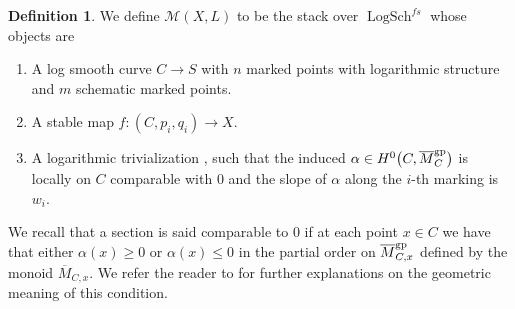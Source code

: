 \documentclass[pdftex]{sigma}
\newcommand{\M}{\mathcal{M}}
\renewcommand{\leq}{\leqslant}
\renewcommand{\geq}{\geqslant}
\numberwithin{equation}{section}
\theoremstyle{definition}
\newtheorem{defi}[theo]{Definition}
\begin{document}
\begin{defi}\label{def:logstablemaps}
 We define $\M(X,L)$ to be the stack over $\operatorname{LogSch}^{fs}$ whose objects are
 \begin{enumerate}\itemsep=0pt
 \item [(1)] A log smooth curve $C\to S$ with $n$ marked points with logarithmic structure and $m$ schematic marked points.
 \item [(2)] A stable map $f\colon (C,p_i,q_i)\to X$.
 \item [(3)] A logarithmic trivialization , such that the induced $\alpha\in H^0\bigl(C,\allowbreak\overline{M}_C^{\rm gp}\bigr)$ is locally on $C$ comparable with $0$ and the slope of $\alpha$ along the $i$-th marking is $w_i$.
 \end{enumerate}

We recall that a section  is said comparable to $0$ if at each point $x\in C$ we have that either $\alpha(x)\geq 0$ or $\alpha(x)\leq 0$ in the partial order on $\overline{M}^{\rm gp}_{C,x}$ defined by the monoid $\overline{M}_{C,x}$. We refer the reader to \cite[Section~2.5]{RSPW2} for further explanations on the geometric meaning of this condition.
\end{defi}
\end{document}
